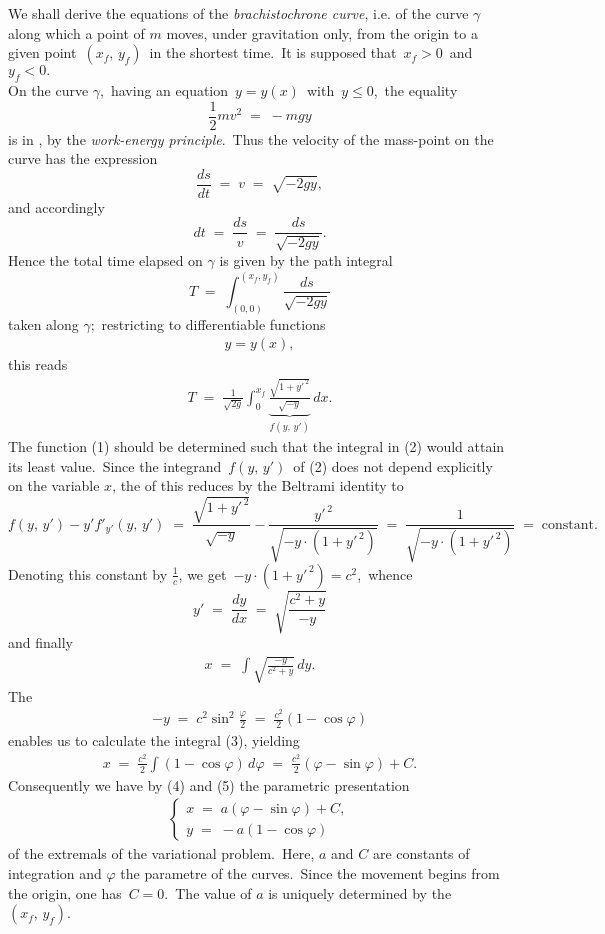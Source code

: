 \documentclass[12pt]{article}
\theoremstyle{definition}
\begin{document}
We shall derive the equations of the \emph{brachistochrone curve}, i.e. of the curve $\gamma$ along which a point of  $m$ moves, under gravitation only, from the origin to a given point \,$(x_f,\,y_f)$\, in the shortest time.\, It is supposed that\, 
$x_f > 0$\, and\, $y_f < 0.$\\

On the curve $\gamma$,\, having an equation\, $y = y(x)$\, with\, $y \le 0$,\, the equality
$$\frac{1}{2}mv^2 \;=\; -mgy$$
is in , by the \emph{work-energy principle}.\, Thus the velocity of the mass-point on the curve has the expression
$$\frac{ds}{dt} \;=\; v \;=\; \sqrt{-2gy},$$
and accordingly
$$dt \;=\; \frac{ds}{v} \;=\; \frac{ds}{\sqrt{-2gy}}.$$
Hence the total time elapsed on $\gamma$ is given by the path integral
$$T \;=\; \int_{(0,0)}^{(x_f,y_f)}\!\frac{ds}{\sqrt{-2gy}}$$
taken along $\gamma$;\, restricting to differentiable functions
\begin{align}
y = y(x),
\end{align}
this reads
\begin{align}
T \;=\; \frac{1}{\sqrt{2g}}\int_0^{x_f}\!\underbrace{\frac{\sqrt{1\!+\!y'^{\,2}}}{\sqrt{-y}}}_{f(y,\,y')}\,dx.
\end{align}
The function (1) should be determined such that the integral in (2) would attain its least value.\, Since the integrand \,$f(y,\,y')$\, of (2) does not depend explicitly on the variable $x$, the  of this  reduces by the Beltrami identity to 
$$f(y,\,y')-y'f'_{y'}(y,\,y') 
\;=\; \frac{\sqrt{1\!+\!y'^{\,2}}}{\sqrt{-y}}-\frac{y'^{\,2}}{\sqrt{-y\!\cdot\!(1\!+\!y'^{\,2})}}
\;=\; \frac{1}{\sqrt{-y\!\cdot\!(1\!+\!y'^{\,2})}} \;=\; \mbox{constant}.$$
Denoting this constant by $\frac{1}{c}$, we get\, $-y\!\cdot\!(1\!+\!y'^{\,2}) = c^2$,\, whence
$$y' \;=\; \frac{dy}{dx} \;=\; \sqrt{\frac{c^2\!+\!y}{-y}}$$
and finally
\begin{align}
x \;=\; \int\!\sqrt{\frac{-y}{c^2\!+\!y}}\,dy.
\end{align}
The 
\begin{align}
-y \;=\; c^2\sin^2\frac{\varphi}{2} \;=\; \frac{c^2}{2}(1-\cos\varphi)
\end{align}
enables us to calculate the integral (3), yielding
\begin{align}
x \;=\; \frac{c^2}{2}\int(1-\cos\varphi)\,d\varphi \;=\; \frac{c^2}{2}(\varphi-\sin\varphi)+C.
\end{align}
Consequently we have by (4) and (5) the parametric presentation
\begin{align}
\begin{cases}
x \;=\; a(\varphi-\sin\varphi)+C,\\
y \;=\; -a(1-\cos\varphi)
\end{cases}
\end{align}
of the extremals of the variational problem.\, Here, $a$ and $C$ are constants of integration and $\varphi$ the parametre of the curves.\, Since the movement begins from the origin, one has\, $C = 0$.\, The value of $a$ is uniquely determined by the \, $(x_f,\,y_f)$.\\ 
\end{document}
